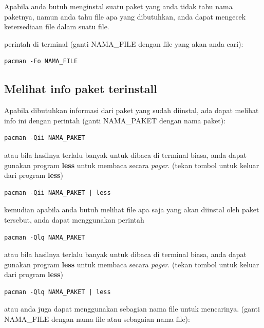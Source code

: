 \documentclass[12pt,]{article}
\begin{document}
	Apabila anda butuh menginstal suatu paket yang anda tidak tahu nama paketnya,
	namun anda tahu file apa yang dibutuhkan, anda dapat mengecek ketersediaan file dalam suatu file.
	
	perintah di terminal (ganti NAMA\_FILE dengan file yang akan anda cari):
	
	\begin{verbatim}
pacman -Fo NAMA_FILE
	\end{verbatim}
	
	\subsection{Melihat info paket terinstall}
	
	Apabila dibutuhkan informasi dari paket yang sudah diinstal, ada dapat melihat info ini dengan perintah
	(ganti NAMA\_PAKET dengan nama paket):
	
	\begin{verbatim}
pacman -Qii NAMA_PAKET
	\end{verbatim}
	
	atau bila hasilnya terlalu banyak untuk dibaca di terminal biasa, anda dapat gunakan program \textbf{less} untuk membaca secara \textit{pager}.
	(tekan tombol  untuk keluar dari program \textbf{less})
	
	\begin{verbatim}
pacman -Qii NAMA_PAKET | less
	\end{verbatim}
	
	kemudian apabila anda butuh melihat file apa saja yang akan diinstal oleh paket tersebut, anda dapat menggunakan perintah
	
	\begin{verbatim}
pacman -Qlq NAMA_PAKET
	\end{verbatim}
	
	atau bila hasilnya terlalu banyak untuk dibaca di terminal biasa, anda dapat gunakan program \textbf{less} untuk membaca secara \textit{pager}.
	(tekan tombol  untuk keluar dari program \textbf{less})
	
	\begin{verbatim}
pacman -Qlq NAMA_PAKET | less
	\end{verbatim}
	
	atau anda juga dapat menggunakan sebagian nama file untuk mencarinya.
	(ganti NAMA\_FILE dengan nama file atau sebagaian nama file):
	
\end{document}
